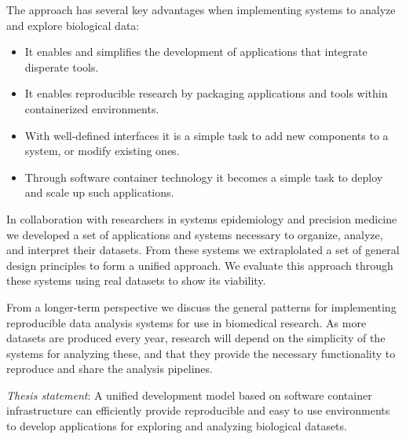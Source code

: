 The approach has several key advantages when implementing systems to analyze and
explore biological data:
\begin{itemize} 
    \item It enables and simplifies the development of applications that
        integrate disperate tools. 
        
    \item It enables reproducible research by packaging applications
        and tools within containerized environments. 

    \item With well-defined interfaces it is a simple task to add new components
        to a system, or modify existing ones. 
        
    \item Through software container technology it becomes a simple task to
        deploy and scale up such applications. 
\end{itemize} 

In collaboration with researchers in systems epidemiology and precision
medicine we developed a set of applications and systems necessary to organize,
analyze, and interpret their datasets. From these systems we extraplolated a set
of general design principles to form a unified approach. We evaluate this
approach through these systems using real datasets to show its viability. 

From a longer-term perspective we discuss the general patterns for implementing
reproducible data analysis systems for use in biomedical research. As more
datasets are produced every year, research will depend on the simplicity of the
systems for analyzing these, and that they provide the necessary functionality
to reproduce and share the analysis pipelines. 

\emph{Thesis statement}:
A unified development model based on software container infrastructure can
efficiently provide reproducible and easy to use environments to develop
applications for exploring and analyzing biological datasets. 

